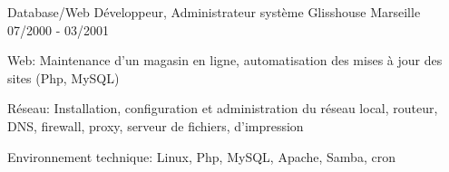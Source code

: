 \begin{cventries}
  \cventry
    {Database/Web Développeur, Administrateur système}
    {Glisshouse}
    {Marseille}
    {07/2000 - 03/2001}
    {
      \begin{cvitems}
        \item {Web: Maintenance d'un magasin en ligne, automatisation des mises à jour des sites (Php, MySQL)}
        \item {Réseau: Installation, configuration et administration du réseau local, routeur, DNS, firewall, proxy, serveur de fichiers, d'impression}
		\item {Environnement technique: Linux, Php, MySQL, Apache, Samba, cron}
      \end{cvitems}
    }

\end{cventries}

